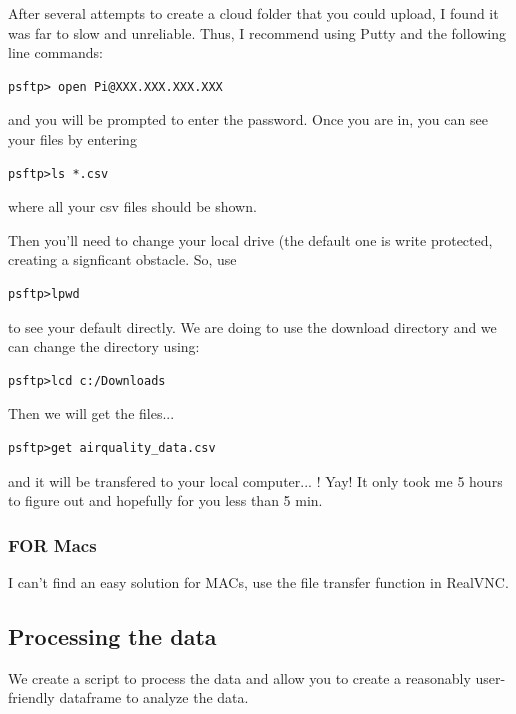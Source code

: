 \documentclass{article}\usepackage[]{graphicx}\usepackage[]{color}
\begin{document}
After several attempts to create a cloud folder that you could upload, I found it was far to slow and unreliable. Thus, I recommend using Putty and the following line commands:

\begin{lstlisting}
psftp> open Pi@XXX.XXX.XXX.XXX
\end{lstlisting}

and you will be prompted to enter the password. Once you are in, you can see your files by entering

\begin{lstlisting}
psftp>ls *.csv
\end{lstlisting}


\noindent where all your csv files should be shown. 

Then you'll need to change your local drive (the default one is write protected, creating a signficant obstacle. So, use 

\begin{lstlisting}
psftp>lpwd
\end{lstlisting}
 

\noindent to see your default directly. We are doing to use the download directory and we can change the directory using:

\begin{lstlisting}
psftp>lcd c:/Downloads
\end{lstlisting}

Then we will get the files...

\begin{lstlisting}
psftp>get airquality_data.csv
\end{lstlisting}


and it will be transfered to your local computer... !  Yay!  It only took me 5 hours to figure out and hopefully for you less than 5 min. 

\subsubsection{FOR Macs}

I can't find an easy solution for MACs, use the file transfer function in RealVNC.

\subsection{Processing the data}

We create a script to process the data and allow you to create a reasonably user-friendly dataframe to analyze the data.
\end{document}
